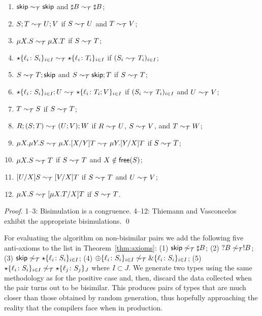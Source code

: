 \begin{theorem}
\label{thm:axioms}
  \begin{enumerate}
  \item $\mathsf{skip} \sim_\mathcal T \mathsf{skip}$ and $\sharp B \sim_\mathcal T \sharp B$;
  \item $S;T \sim_\mathcal T U;V$ if $S \sim_\mathcal T U$ and $T \sim_\mathcal T V$;
  \item $\mu X.S \sim_\mathcal T \mu X.T$ if $S \sim_\mathcal T T$;
  \item $\star\{\ell_i\colon S_i\}_{i\in I}\sim_\mathcal T
    \star\{\ell_i\colon T_i\}_{i\in I}$ if $(S_i \sim_\mathcal T T_i)_{i\in
      I}$;
  \item $S\sim_\mathcal T T;\mathsf{skip}$ and $S\sim_\mathcal T \mathsf{skip};T$ if $S \sim_\mathcal T T$;
  \item $\star\{\ell_i\colon S_i\}_{i\in I};U\sim_\mathcal T
    \star\{\ell_i\colon T_i;V\}_{i\in I}$ if $(S_i \sim_\mathcal T T_i)_{i\in
      I}$ and $U \sim_\mathcal T V$;
  \item $T \sim_\mathcal T S$ if $S \sim_\mathcal T T$;
  \item $R;(S;T) \sim_\mathcal T (U;V);W$ if $R \sim_\mathcal T U$, $S \sim_\mathcal T V$, and $T\sim_\mathcal T W$;
  \item
    $\mu X.\mu Y.S \sim_\mathcal T \mu X.[{X}/{Y}]T \sim_\mathcal T \mu Y.[{Y}/{X}]T$ if $S \sim_\mathcal T T$;
  \item $\mu X.S \sim_\mathcal T T$ if $S \sim_\mathcal T T$ and $X\notin\mathsf{free}(S)$;
  \item $[{U}/{X}]S\sim_\mathcal T [{V}/{X}]T$  if $S \sim_\mathcal T T$ and $U \sim_\mathcal T V$;
  \item $\mu X.S \sim_\mathcal T [{\mu X.T}/{X}]T$ if $S \sim_\mathcal T T$.
  \end{enumerate}
\end{theorem}
%
\begin{proof}
  1--3: Bisimulation is a congruence. 4--12: Thiemann and
  Vasconcelos~\cite{thiemann2016context} exhibit the appropriate
  bisimulations. \qed
\end{proof}

For evaluating the algorithm on non-bisimilar pairs we add the 
following five anti-axioms to the list in 
Theorem~\ref{thm:axioms}:
(1) $\mathsf{skip} \not\sim_\mathcal T \sharp B$; \enspace
(2) $?B \not\sim_\mathcal T !B$; \enspace
(3) $\mathsf{skip} \not\sim_\mathcal T \star\{\ell_i\colon S_i\}_{i\in I}$; \enspace
(4) $\oplus\{\ell_i\colon S_i\}_{i\in I} \not\sim_\mathcal T \&\{\ell_i\colon S_i\}_{i\in I}$; \enspace
(5) $\star\{\ell_i\colon S_i\}_{i\in I} \not\sim_\mathcal T \star\{\ell_j\colon S_j\}_J$
where $I \subset J$.
%
We generate two types using the same methodology as for the positive
case and, then, discard the data collected when the pair turns out to
be bisimilar.
%
This produces pairs of types that are much closer than those obtained
by random generation, thus hopefully approaching the reality that the
compilers face when in production.

